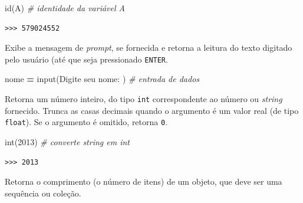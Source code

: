 \documentclass[
]{book}
\newenvironment{Shaded}{\begin{snugshade}}{\end{snugshade}}
\newcommand{\BuiltInTok}[1]{#1}
\newcommand{\CommentTok}[1]{\textcolor[rgb]{0.56,0.35,0.01}{\textit{#1}}}
\newcommand{\NormalTok}[1]{#1}
\newcommand{\OperatorTok}[1]{\textcolor[rgb]{0.81,0.36,0.00}{\textbf{#1}}}
\newcommand{\StringTok}[1]{\textcolor[rgb]{0.31,0.60,0.02}{#1}}
\providecommand{\tightlist}{%
  \setlength{\itemsep}{0pt}\setlength{\parskip}{0pt}}
\begin{document}
\begin{Shaded}
\begin{Highlighting}[]
\BuiltInTok{id}\NormalTok{(A) }\CommentTok{\# identidade da variável A}
\end{Highlighting}
\end{Shaded}

\begin{verbatim}
>>> 579024552
\end{verbatim}

\begin{description}
\tightlist
\item[\texttt{input(prompt)}]
Exibe a mensagem de \emph{prompt}, se fornecida e retorna a leitura do texto digitado pelo usuário (até que seja pressionado \texttt{ENTER}.
\end{description}

\begin{Shaded}
\begin{Highlighting}[]
\NormalTok{nome }\OperatorTok{=} \BuiltInTok{input}\NormalTok{(}\StringTok{\textquotesingle{}Digite seu nome: \textquotesingle{}}\NormalTok{) }\CommentTok{\# entrada de dados}
\end{Highlighting}
\end{Shaded}

\begin{description}
\tightlist
\item[\texttt{int(x)}]
Retorna um número inteiro, do tipo \texttt{int} correspondente ao número ou \emph{string} fornecido. Trunca as casas decimais quando o argumento é um valor real (de tipo \texttt{float}). Se o argumento é omitido, retorna \texttt{0}.
\end{description}

\begin{Shaded}
\begin{Highlighting}[]
\BuiltInTok{int}\NormalTok{(}\StringTok{\textquotesingle{}2013\textquotesingle{}}\NormalTok{) }\CommentTok{\# converte string em int}
\end{Highlighting}
\end{Shaded}

\begin{verbatim}
>>> 2013
\end{verbatim}

\begin{description}
\tightlist
\item[\texttt{len(objeto)}]
Retorna o comprimento (o número de itens) de um objeto, que deve ser uma sequência ou coleção.
\end{description}
\end{document}
